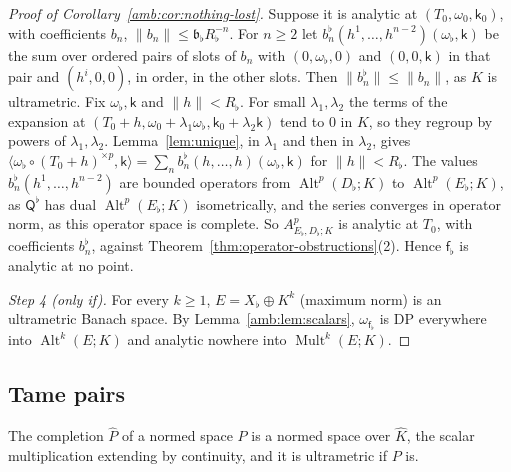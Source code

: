\documentclass[11pt]{amsart}
\theoremstyle{definition}
\theoremstyle{remark}
\numberwithin{equation}{section}
\newcommand{\Alt}{\operatorname{Alt}}
\newcommand{\Mult}{\operatorname{Mult}}
\newcommand{\norm}[1]{\lVert #1\rVert}
\newcommand{\Kh}{\widehat K}
\theoremstyle{plain}
\theoremstyle{definition}
\theoremstyle{plain}
\begin{document}
\begin{proof}[Proof of Corollary~\ref{amb:cor:nothing-lost}]
Suppose it is analytic at $(T_0,\omega_0,\mathsf k_0)$, with coefficients $b_n$, $\norm{b_n}\le \mathfrak b_\flat R_\flat^{-n}$. For $n\ge2$ let $b^\flat_n(h^1,\dots,h^{n-2})(\omega_\flat,\mathsf k)$ be the sum over ordered pairs of slots of $b_n$ with $(0,\omega_\flat,0)$ and $(0,0,\mathsf k)$ in that pair and $(h^i,0,0)$, in order, in the other slots. Then $\norm{b^\flat_n}\le\norm{b_n}$, as $K$ is ultrametric. Fix $\omega_\flat,\mathsf k$ and $\norm h<R_\flat$. For small $\lambda_1,\lambda_2$ the terms of the expansion at $(T_0+h,\omega_0+\lambda_1\omega_\flat,\mathsf k_0+\lambda_2\mathsf k)$ tend to $0$ in $K$, so they regroup by powers of $\lambda_1,\lambda_2$. Lemma~\ref{lem:unique}, in $\lambda_1$ and then in $\lambda_2$, gives $\langle\omega_\flat\circ(T_0+h)^{\times p},\mathsf k\rangle=\sum_nb^\flat_n(h,\dots,h)(\omega_\flat,\mathsf k)$ for $\norm h<R_\flat$. The values $b^\flat_n(h^1,\dots,h^{n-2})$ are bounded operators from $\Alt^p(D_\flat;K)$ to $\Alt^p(E_\flat;K)$, as $\mathsf Q^\flat$ has dual $\Alt^p(E_\flat;K)$ isometrically, and the series converges in operator norm, as this operator space is complete. So $A^p_{E_\flat,D_\flat;K}$ is analytic at $T_0$, with coefficients $b^\flat_n$, against Theorem~\ref{thm:operator-obstructions}(2). Hence $\mathsf f_\flat$ is analytic at no point.

\emph{Step 4 (only if).} For every $k\ge1$, $E=X_\flat\oplus K^k$ (maximum norm) is an ultrametric Banach space. By Lemma~\ref{amb:lem:scalars}, $\omega_{\mathsf f_\flat}$ is DP everywhere into $\Alt^k(E;K)$ and analytic nowhere into $\Mult^k(E;K)$.
\end{proof}
\subsection{Tame pairs}\label{amb:ssec:proofs-tame}

The completion $\widehat P$ of a normed space $P$ is a normed space over $\Kh$, the scalar multiplication extending by
continuity, and it is ultrametric if $P$ is.
\end{document}

